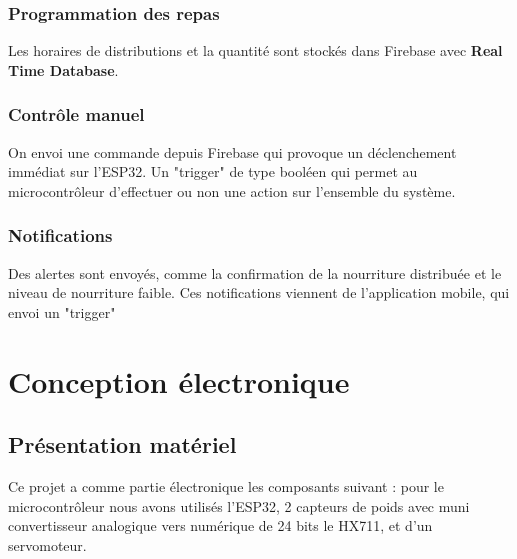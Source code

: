 \subsection{Programmation des repas} 
Les horaires de distributions et la quantité sont stockés dans Firebase avec \textbf{Real Time Database}.

\subsection{Contrôle manuel}
On envoi une commande depuis Firebase qui provoque un déclenchement immédiat sur l’ESP32. Un "trigger" de type booléen qui permet au microcontrôleur d'effectuer  ou non une action sur l'ensemble du système.

\subsection{Notifications}
Des alertes sont envoyés, comme la confirmation de la nourriture distribuée et le niveau de nourriture faible. Ces notifications viennent de l'application mobile, qui envoi un "trigger"


\pagestyle{fancy}
\fancyhead{} %
\chapter{Conception électronique}
\section{Présentation matériel}
Ce projet a comme partie électronique les composants suivant : pour le microcontrôleur nous avons utilisés l'ESP32, 2 capteurs de poids avec muni convertisseur analogique vers numérique de 24 bits le HX711, et d'un servomoteur.


